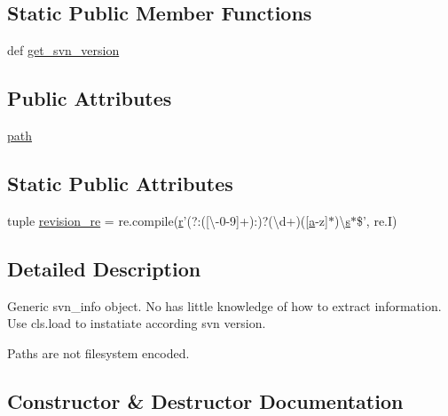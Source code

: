 \subsection*{Static Public Member Functions}
\begin{DoxyCompactItemize}
\item 
def \hyperlink{classsetuptools_1_1svn__utils_1_1SvnInfo_ab1ff5d770a9188c79381c1faadbaa334}{get\+\_\+svn\+\_\+version}
\end{DoxyCompactItemize}
\subsection*{Public Attributes}
\begin{DoxyCompactItemize}
\item 
\hyperlink{classsetuptools_1_1svn__utils_1_1SvnInfo_a5bdc4b209c9280da01e4df04435c34e3}{path}
\end{DoxyCompactItemize}
\subsection*{Static Public Attributes}
\begin{DoxyCompactItemize}
\item 
tuple \hyperlink{classsetuptools_1_1svn__utils_1_1SvnInfo_a0237d252d663be30acf705d872948e66}{revision\+\_\+re} = re.\+compile(\hyperlink{indexexpr_8h_ac434fd11cc2493608d8d91424d60c17e}{r}'(?\+:(\mbox{[}\textbackslash{}-\/0-\/9\mbox{]}+)\+:)?(\textbackslash{}d+)(\mbox{[}\hyperlink{gen__mat5files_8m_aae328bf20413f220e38aec4d95bfd6da}{a}-\/z\mbox{]}$\ast$)\textbackslash{}\hyperlink{indexexpr_8h_ae024b0db549122b44c349ae28ec990dc}{s}$\ast$\$', re.\+I)
\end{DoxyCompactItemize}


\subsection{Detailed Description}
\begin{DoxyVerb}Generic svn_info object.  No has little knowledge of how to extract
information.  Use cls.load to instatiate according svn version.

Paths are not filesystem encoded.
\end{DoxyVerb}
 

\subsection{Constructor \& Destructor Documentation}
\hypertarget{classsetuptools_1_1svn__utils_1_1SvnInfo_a60e9dcbaab938486767692c1981a6873}{}
